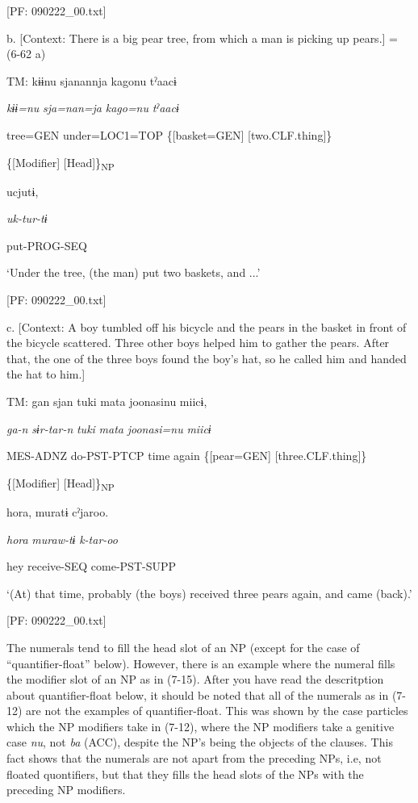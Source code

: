       [PF: 090222\_00.txt]

  b.  [Context: There is a big pear tree, from which a man is picking up pears.] = (6-62 a)

    TM:  kɨɨnu  sjanannja  kagonu  tˀaacɨ

      \textit{kɨɨ=nu}  \textit{sja=nan=ja}  \textit{kago=nu}  \textit{tˀaacɨ}

      tree=GEN  under=LOC1=TOP  \{[basket=GEN]  [two.CLF.thing]\}

          \{[Modifier]  [Head]\}\textsubscript{NP}

      ucjutɨ,

      \textit{uk-tur-tɨ}

      put-PROG-SEQ

      ‘Under the tree, (the man) put two baskets, and ...’

      [PF: 090222\_00.txt]

  c.  [Context: A boy tumbled off his bicycle and the pears in the basket in front of the bicycle scattered. Three other boys helped him to gather the pears. After that, the one of the three boys found the boy’s hat, so he called him and handed the hat to him.]

    TM:  gan  sjan  tuki  mata  joonasinu  miicɨ,

      \textit{ga-n}  \textit{sɨr-tar-n}  \textit{tuki}  \textit{mata}  \textit{joonasi=nu}  \textit{miicɨ}

      MES-ADNZ  do-PST-PTCP  time  again  \{[pear=GEN]  [three.CLF.thing]\}

              \{[Modifier]  [Head]\}\textsubscript{NP}

      {\textbar}hora{\textbar},  muratɨ  cˀjaroo.

      \textit{hora}  \textit{muraw-tɨ}  \textit{k-tar-oo}

      hey  receive-SEQ  come-PST-SUPP

      ‘(At) that time, probably (the boys) received three pears again, and came (back).’

      [PF: 090222\_00.txt]

The numerals tend to fill the head slot of an NP (except for the case of “quantifier-float” below). However, there is an example where the numeral fills the modifier slot of an NP as in (7-15). After you have read the descritption about quantifier-float below, it should be noted that all of the numerals as in (7-12) are not the examples of quantifier-float. This was shown by the case particles which the NP modifiers take in (7-12), where the NP modifiers take a genitive case \textit{nu}, not \textit{ba} (ACC), despite the NP’s being the objects of the clauses. This fact shows that the numerals are not apart from the preceding NPs, i.e, not floated quontifiers, but that they fills the head slots of the NPs with the preceding NP modifiers.

